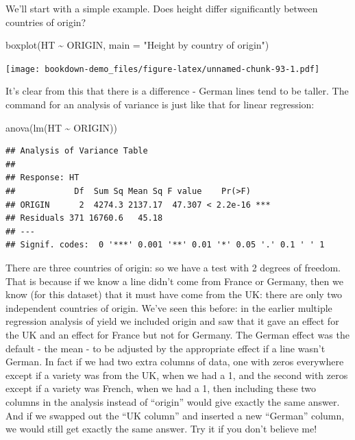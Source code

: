 \documentclass[
]{book}
\newenvironment{Shaded}{\begin{snugshade}}{\end{snugshade}}
\newcommand{\AttributeTok}[1]{\textcolor[rgb]{0.77,0.63,0.00}{#1}}
\newcommand{\FunctionTok}[1]{\textcolor[rgb]{0.00,0.00,0.00}{#1}}
\newcommand{\NormalTok}[1]{#1}
\newcommand{\SpecialCharTok}[1]{\textcolor[rgb]{0.00,0.00,0.00}{#1}}
\newcommand{\StringTok}[1]{\textcolor[rgb]{0.31,0.60,0.02}{#1}}
\begin{document}
We'll start with a simple example. Does height differ significantly between countries of origin?

\begin{Shaded}
\begin{Highlighting}[]
\FunctionTok{boxplot}\NormalTok{(HT }\SpecialCharTok{\textasciitilde{}}\NormalTok{ ORIGIN, }\AttributeTok{main =} \StringTok{"Height by country of origin"}\NormalTok{)}
\end{Highlighting}
\end{Shaded}

\texttt{[image: bookdown-demo\_files/figure-latex/unnamed-chunk-93-1.pdf]}

It's clear from this that there is a difference - German lines tend to be taller. The command for an analysis of variance is just like that for linear regression:

\begin{Shaded}
\begin{Highlighting}[]
\FunctionTok{anova}\NormalTok{(}\FunctionTok{lm}\NormalTok{(HT }\SpecialCharTok{\textasciitilde{}}\NormalTok{ ORIGIN))}
\end{Highlighting}
\end{Shaded}

\begin{verbatim}
## Analysis of Variance Table
## 
## Response: HT
##            Df  Sum Sq Mean Sq F value    Pr(>F)    
## ORIGIN      2  4274.3 2137.17  47.307 < 2.2e-16 ***
## Residuals 371 16760.6   45.18                      
## ---
## Signif. codes:  0 '***' 0.001 '**' 0.01 '*' 0.05 '.' 0.1 ' ' 1
\end{verbatim}

There are three countries of origin: so we have a test with 2 degrees of freedom. That is because if we know a line didn't come from France or Germany, then we know (for this dataset) that it must have come from the UK: there are only two independent countries of origin. We've seen this before: in the earlier multiple regression analysis of yield we included origin and saw that it gave an effect for the UK and an effect for France but not for Germany. The German effect was the default - the mean - to be adjusted by the appropriate effect if a line wasn't German. In fact if we had two extra columns of data, one with zeros everywhere except if a variety was from the UK, when we had a 1, and the second with zeros except if a variety was French, when we had a 1, then including these two columns in the analysis instead of ``origin'' would give exactly the same answer. And if we swapped out the ``UK column'' and inserted a new ``German'' column, we would still get exactly the same answer. Try it if you don't believe me!
\end{document}
